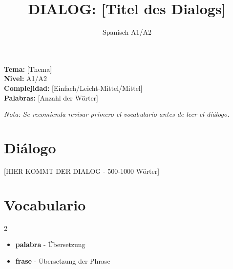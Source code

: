 \documentclass[12pt,a4paper]{article}
\begin{document}
\title{\textbf{DIALOG: [Titel des Dialogs]}}
\author{Spanisch A1/A2}
\date{}
\maketitle

\textbf{Tema:} [Thema] \\
\textbf{Nivel:} A1/A2 \\
\textbf{Complejidad:} [Einfach/Leicht-Mittel/Mittel] \\
\textbf{Palabras:} [Anzahl der Wörter]

\vspace{1em}

\textit{Nota: Se recomienda revisar primero el vocabulario antes de leer el diálogo.}

\vspace{1em}

\section*{Diálogo}

[HIER KOMMT DER DIALOG - 500-1000 Wörter]

% 
% 

\newpage

\section*{Vocabulario}

\begin{multicols}{2}
\begin{itemize}[leftmargin=*]
    \item \textbf{palabra} - Übersetzung
    \item \textbf{frase} - Übersetzung der Phrase
\end{itemize}
\end{multicols}

\newpage

\end{document}
